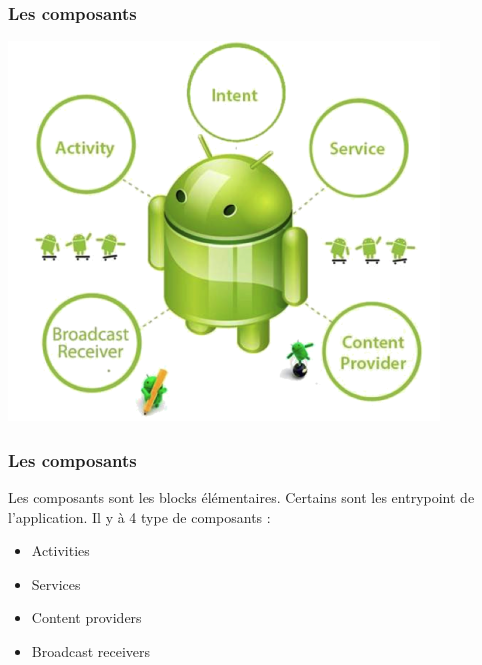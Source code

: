 \documentclass{beamer}
\begin{document}
\begin{frame}
\frametitle{Les composants}

\begin{center}
\includegraphics[scale=0.5]{components.png}
\end{center}
\end{frame}

\begin{frame}
\frametitle{Les composants}

\begin{block}{}
 Les composants sont les blocks élémentaires. Certains sont les entrypoint de l'application. Il y à 4 type de composants :
\end{block}

\begin{itemize}
	\item Activities
	\item Services
	\item Content providers
	\item Broadcast receivers
\end{itemize}

\end{frame}
\end{document}
